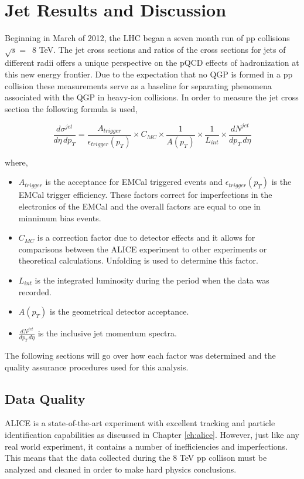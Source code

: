 \chapter{Jet Results and Discussion} \label{ch:analysis}

Beginning in March of 2012, the LHC began a seven month run of pp collisions $\sqrt{s} = \,$ 8 TeV.  The jet cross sections and ratios of the cross sections for jets of different radii offers a unique perspective on the pQCD effects of hadronization at this new energy frontier.  Due to the expectation that no QGP is formed in a pp collision these measurements serve as a baseline for separating phenomena associated with the QGP in heavy-ion collisions.  In order to measure the jet cross section the following formula is used,

\begin{equation}
	\frac{d \sigma^{jet}}{d\eta \, dp_{T}} = \frac{A_{trigger}}{\epsilon_{trigger}(p_{T})} \times C_{MC} \times \frac{1}{A(p_{T}) } \times \frac{1}{L_{int}} \times \frac{dN^{jet}}{dp_{T} \, d\eta}
\label{eq:xsecdef}
\end{equation}

\noindent
where,

\begin{itemize}
  \item $A_{trigger}$ is the acceptance for EMCal triggered events and $\epsilon_{trigger}(p_{T})$ is the EMCal trigger efficiency.  These factors correct for imperfections in the electronics of the EMCal and the overall factors are equal to one in minnimum bias events.
  \item $C_{MC}$ is a correction factor due to detector effects and it allows for comparisons between the ALICE experiment to other experiments or theoretical calculations.  Unfolding is used to determine this factor.
  \item $L_{int}$ is the integrated luminosity during the period when the data was recorded.
  \item $A(p_{T})$ is the geometrical detector acceptance.
  \item $\frac{dN^{jet}}{dp_{T} \, d\eta}$ is the inclusive jet momentum spectra.
  
\end{itemize}

The following sections will go over how each factor was determined and the quality assurance procedures used for this analysis.

\section{Data Quality}
ALICE is a state-of-the-art experiment with excellent tracking and particle identification capabilities as discussed in Chapter \ref{ch:alice}.  However, just like any real world experiment, it contains a number of inefficiencies and imperfections.  This means that the data collected during the 8 TeV pp collison must be analyzed and cleaned in order to make hard physics conclusions.  


